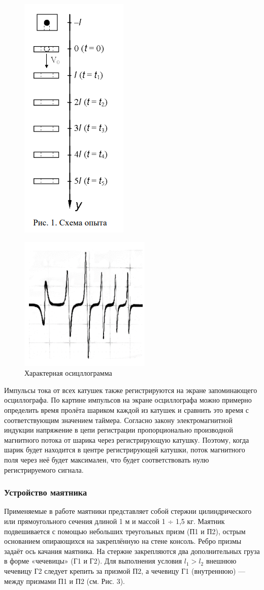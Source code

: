 \documentclass[a4paper, 12pt]{article}
\begin{document}
\begin{center}
\begin{figure}[H]
    \centering
    \includegraphics[width=0.25\linewidth]{image_3.png}
\end{figure}
\begin{figure}[H]
    \centering
    \includegraphics[width=0.25\linewidth]{image_4.png}
    \caption{Характерная осицллограмма}
\end{figure}

Импульсы тока от всех катушек также регистрируются на экране запоминающего осциллографа. По картине импульсов на экране осциллографа можно примерно определить 
время пролёта шариком каждой из катушек и 
сравнить это время с соответствующим значением таймера. Согласно закону электромагнитной индукции напряжение в цепи регистрации пропорционально производной магнитного потока от шарика через регистрирующую катушку. Поэтому, когда шарик будет находится в центре 
регистрирующей катушки, поток магнитного поля через неё будет максимален, 
что будет соответствовать нулю регистрируемого сигнала.\\
\bigskip
\subsubsection*{Устройство маятника}
\bigskip
Применяемые в работе маятники представляет собой стержни цилиндрического или прямоугольного сечения длиной 1 м и массой 1 ÷ 1,5 кг. Маятник подвешивается с помощью небольших треугольных призм (П1 и П2), острым основанием опирающихся на закреплённую на стене консоль. Ребро призмы задаёт ось качания маятника. На стержне закрепляются два дополнительных груза в форме «чечевицы» (Г1 и Г2). Для выполнения условия $l_{1} > l_{2}$ внешнюю чечевицу Г2 следует крепить за призмой П2, а чечевицу Г1 (внутреннюю) — между призмами П1 и П2 (см. Рис. 3).


\end{center}
\end{document}
